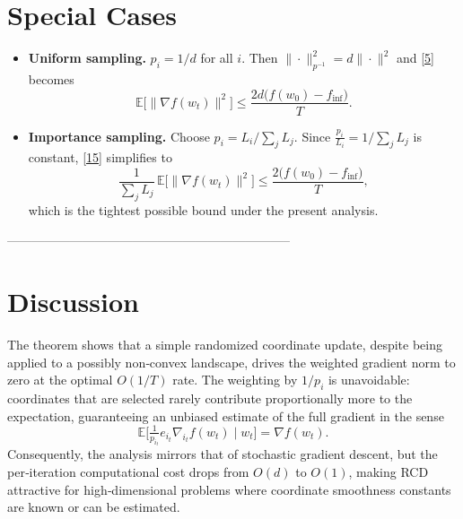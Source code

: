 \documentclass{article}
\newcommand{\E}{\mathbb{E}}
\begin{document}
\section*{Special Cases}
\begin{itemize}
\item \textbf{Uniform sampling.} $p_i=1/d$ for all $i$.  Then $\|\cdot\|_{p^{-1}}^{2}=d\|\cdot\|^{2}$ and \eqref{5} becomes
\[
\E\!\big[\|\nabla f(w_t)\|^{2}\big]\le \frac{2d\big(f(w_0)-f_{\inf}\big)}{T}.
\]
\item \textbf{Importance sampling.} Choose $p_i = L_i/\sum_j L_j$.  Since $\frac{p_i}{L_i}=1/\sum_j L_j$ is constant,
\eqref{15} simplifies to
\[
\frac{1}{\sum_j L_j}\,\E\!\big[\|\nabla f(w_t)\|^{2}\big]\le \frac{2\big(f(w_0)-f_{\inf}\big)}{T},
\]
which is the tightest possible bound under the present analysis.
\end{itemize}

--------------------------------------------------------------------

\section*{Discussion}
The theorem shows that a simple randomized coordinate update, despite being applied to a possibly non‑convex landscape, drives the weighted gradient norm to zero at the optimal $O(1/T)$ rate.  
The weighting by $1/p_i$ is unavoidable: coordinates that are selected rarely contribute proportionally more to the expectation, guaranteeing an unbiased estimate of the full gradient in the sense
\[
\E\!\big[ \tfrac{1}{p_{i_t}} e_{i_t}\nabla_{i_t} f(w_t) \mid w_t\big]=\nabla f(w_t).
\]
Consequently, the analysis mirrors that of stochastic gradient descent, but the per‑iteration computational cost drops from $O(d)$ to $O(1)$, making RCD attractive for high‑dimensional problems where coordinate smoothness constants are known or can be estimated.
\end{document}
